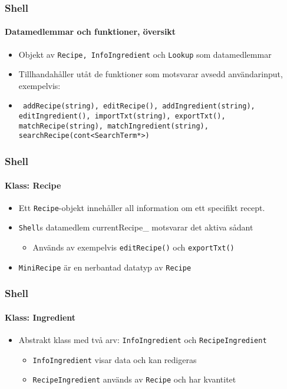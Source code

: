 %
%

\begin{frame}
  \frametitle{Shell}
  \framesubtitle{Datamedlemmar och funktioner, översikt}
  \begin{itemize}
    \item Objekt av \texttt{Recipe, InfoIngredient} och \texttt{Lookup} som datamedlemmar
    \item<2-> Tillhandahåller utåt de funktioner som motsvarar avsedd användarinput, exempelvis:
    \item<2-> \texttt{
      addRecipe(string), editRecipe(),
      addIngredient(string), editIngredient(),
      importTxt(string), exportTxt(),
      matchRecipe(string), matchIngredient(string),
      searchRecipe(cont<SearchTerm*>)
    }
  \end{itemize} 
\end{frame}

\begin{frame}
  \frametitle{Shell}
  \framesubtitle{Klass: Recipe}
  \begin{itemize}
  \item Ett \texttt{Recipe}-objekt innehåller all information om ett specifikt recept.
  \item \texttt{Shell}s datamedlem currentRecipe\_ motsvarar det aktiva sådant
    \begin{itemize}
    \item Används av exempelvis \texttt{editRecipe()} och \texttt{exportTxt()}
    \end{itemize}
  \item \texttt{MiniRecipe} är en nerbantad datatyp av \texttt{Recipe}
  \end{itemize}
\end{frame}

\begin{frame}
  \frametitle{Shell}
  \framesubtitle{Klass: Ingredient}
  \begin{itemize}
  \item Abstrakt klass med två arv: \texttt{InfoIngredient} och \texttt{RecipeIngredient}
    \begin{itemize}
    \item \texttt{InfoIngredient} visar data och kan redigeras
    \item \texttt{RecipeIngredient} används av \texttt{Recipe} och har kvantitet
    \end{itemize}
  \end{itemize}
\end{frame}

